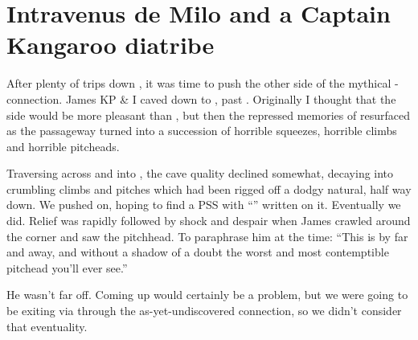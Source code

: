 \section{Intravenus de Milo and a Captain Kangaroo diatribe}


After plenty of trips down , it was time to push the other side
of the mythical - connection. James KP
\& I caved down to , past . Originally I thought that the  side
would be more pleasant than , but then the repressed memories
of  resurfaced as the passageway turned into a
succession of horrible squeezes, horrible climbs and horrible pitcheads.



Traversing across  and into , the cave quality declined somewhat, decaying into crumbling climbs and pitches which had been rigged off a dodgy natural, half way down. We pushed on, hoping to find a PSS with ``'' written on it. Eventually we did. Relief was rapidly followed by shock and despair when James crawled around the corner and saw the  pitchhead. To paraphrase him at the time: ``This is by far and away, and without a shadow of a doubt the worst and most contemptible pitchead you'll ever see.''


He wasn't far off. Coming up would certainly be a problem, but we were going to be exiting via  through the as-yet-undiscovered connection, so we didn't consider that eventuality.

